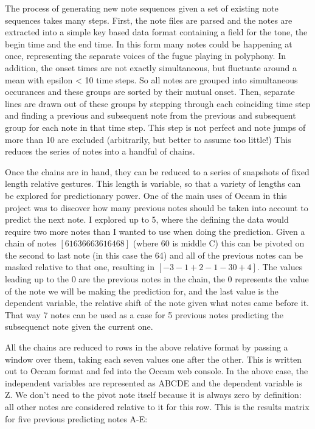 \documentclass[11pt]{article}
\begin{document}
The process of generating new note sequences given a set of existing note sequences takes many steps.  First, the note files are parsed and the notes are extracted into a simple key based data format containing a field for the tone, the begin time and the end time.  In this form many notes could be happening at once, representing the separate voices of the fugue playing in polyphony.  In addition, the onset times are not exactly simultaneous, but fluctuate around a mean with epsilon < 10 time steps.  So all notes are grouped into simultaneous occurances and these groups are sorted by their mutual onset.  Then, separate lines are drawn out of these groups by stepping through each coinciding time step and finding a previous and subsequent note from the previous and subsequent group for each note in that time step.  This step is not perfect and note jumps of more than 10 are excluded (arbitrarily, but better to assume too little!)  This reduces the series of notes into a handful of chains.  

Once the chains are in hand, they can be reduced to a series of snapshots of fixed length relative gestures.  This length is variable, so that a variety of lengths can be explored for predictionary power.  One of the main uses of Occam in this project was to discover how many previous notes should be taken into account to predict the next note.  I explored up to 5, where the defining the data would require two more notes than I wanted to use when doing the prediction.  Given a chain of notes $[61 63 66 63 61 64 68]$ (where 60 is middle C) this can be pivoted on the second to last note (in this case the 64) and all of the previous notes can be masked relative to that one, resulting in $[-3 -1 +2 -1 -3 0 +4]$.  The values leading up to the 0 are the previous notes in the chain, the 0 represents the value of the note we will be making the prediction for, and the last value is the dependent variable, the relative shift of the note given what notes came before it.  That way 7 notes can be used as a case for 5 previous notes predicting the subsequenct note given the current one.

All the chains are reduced to rows in the above relative format by passing a window over them, taking each seven values one after the other.  This is written out to Occam format and fed into the Occam web console.  In the above case, the independent variables are represented as ABCDE and the dependent variable is Z.  We don't need to the pivot note itself because it is always zero by definition:  all other notes are considered relative to it for this row.  This is the results matrix for five previous predicting notes A-E:
\end{document}
